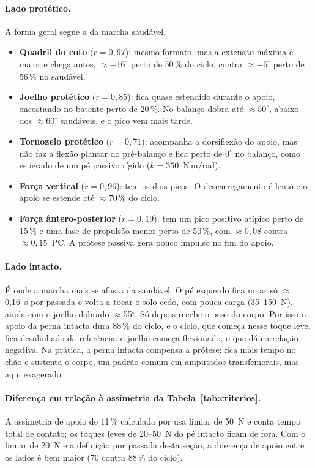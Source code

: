 \documentclass[11pt,a4paper]{article}
\begin{document}
\paragraph{Lado protético.} A forma geral segue a da marcha saudável.
\begin{itemize}
  \item \textbf{Quadril do coto} ($r=0{,}97$): mesmo formato, mas a extensão máxima é maior e chega
        antes, $\approx-16^\circ$ perto de 50\,\% do ciclo, contra $\approx-6^\circ$ perto de 56\,\% no saudável.
  \item \textbf{Joelho protético} ($r=0{,}85$): fica quase estendido durante o apoio, encostando no batente
        perto de 20\,\%. No balanço dobra até $\approx50^\circ$, abaixo dos $\approx60^\circ$ saudáveis, e o pico vem
        mais tarde.
  \item \textbf{Tornozelo protético} ($r=0{,}71$): acompanha a dorsiflexão do apoio, mas não faz a flexão
        plantar do pré-balanço e fica perto de $0^\circ$ no balanço, como esperado de um pé passivo rígido
        ($k=350$~N\,m/rad).
  \item \textbf{Força vertical} ($r=0{,}96$): tem os dois picos. O descarregamento é lento e o apoio se
        estende até $\approx70$\,\% do ciclo.
  \item \textbf{Força ântero-posterior} ($r=0{,}19$): tem um pico positivo atípico perto de 15\,\% e uma
        fase de propulsão menor perto de 50\,\%, com $\approx0{,}08$ contra $\approx0{,}15$~PC. A prótese passiva gera
        pouco impulso no fim do apoio.
\end{itemize}

\paragraph{Lado intacto.} É onde a marcha mais se afasta da saudável. O pé esquerdo fica no ar só
$\approx$0{,}16~s por passada e volta a tocar o solo cedo, com pouca carga (35--150~N), ainda com o joelho
dobrado $\approx$55$^\circ$. Só depois recebe o peso do corpo. Por isso o apoio da perna intacta dura 88\,\%
do ciclo, e o ciclo, que começa nesse toque leve, fica desalinhado da referência: o joelho começa
flexionado, o que dá correlação negativa. Na prática, a perna intacta compensa a prótese: fica mais
tempo no chão e sustenta o corpo, um padrão comum em amputados transfemorais, mas aqui exagerado.

\paragraph{Diferença em relação à assimetria da Tabela~\ref{tab:criterios}.} A assimetria de apoio de 11\,\% calculada
por  usa limiar de 50~N e conta tempo total de contato; os toques leves de 20--50~N do
pé intacto ficam de fora. Com o limiar de 20~N e a definição por passada desta seção, a diferença de
apoio entre os lados é bem maior (70 contra 88\,\% do ciclo).
\end{document}
